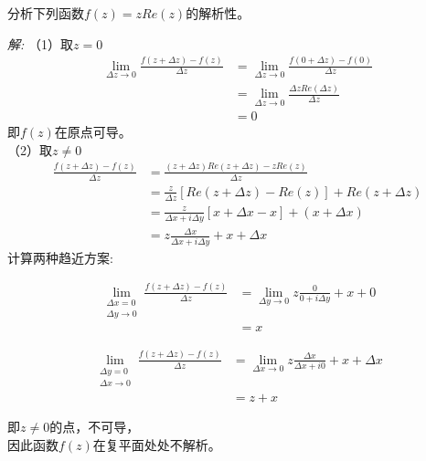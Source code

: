 \begin{example}
    分析下列函数$f(z) =  z Re(z)$的解析性。
\end{example}
  \emph{解:} （1）取$z=0$
  \[ \begin{aligned}
    \lim_{\Delta z \to 0 }  \frac{f(z +  \Delta z) - f(z)}{\Delta z} 
    &= \lim_{\Delta z \to 0 }  \frac{f(0 +  \Delta z) - f(0)}{\Delta z}  \\
    &= \lim_{\Delta z \to 0 }  \frac{\Delta z Re (\Delta z)}{\Delta z} \\
    &= 0
  \end{aligned}\]
  即$f(z)$在原点可导。\\
  （2）取$z \ne 0$ 
  \[ \begin{aligned}
   \frac{f(z +  \Delta z) - f(z)}{\Delta z} 
   &=   \frac{(z +  \Delta z)  Re (z +  \Delta z) - z Re (z)}{\Delta z}  \\
   &= \frac{z}{\Delta z}[ Re (z +  \Delta z) - Re (z) ] +  Re (z +  \Delta z) \\
   &= \frac{z}{\Delta x + i \Delta y }[ x +  \Delta x - x ] +  (x + \Delta x) \\
   &= z \frac{\Delta x}{\Delta x + i \Delta y } + x + \Delta x 
 \end{aligned}\]
 计算两种趋近方案:\\ 
 \begin{inparaenum}[(i)]
    \item \[\begin{aligned}
    \lim _{\substack{\Delta  x = 0 \\ \Delta y \rightarrow 0}} \frac{f(z +  \Delta z) - f(z)}{\Delta z}   
     &=  \lim_{\Delta y \to 0 }  z \frac{0}{0+ i \Delta y } + x + 0 \\
     &= x 
 \end{aligned}\]
 \item \[\begin{aligned}
 \lim _{\substack{\Delta  y = 0 \\ \Delta x \rightarrow 0}} \frac{f(z +  \Delta z) - f(z)}{\Delta z}   
    &=  \lim_{\Delta x \to 0 }  z \frac{\Delta x }{\Delta x + i 0 } + x + \Delta x  \\
    &= z + x 
\end{aligned}\]
\end{inparaenum}
即$z \ne 0$的点，不可导，  \\
因此函数$f(z)$在复平面处处不解析。

